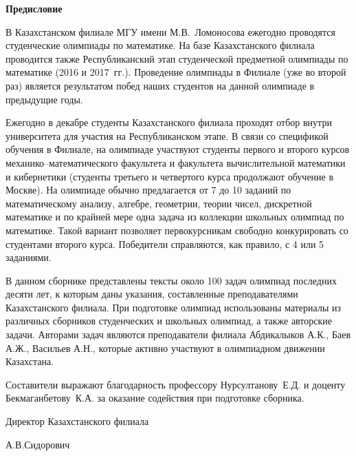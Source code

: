 \documentclass[12pt, a5paper]{article}
\begin{document}
\newpage
\begin{small}
\begin{center}
\textbf{Предисловие}
\end{center}
В Казахстанском филиале  МГУ имени М.В.~Ломоносова ежегодно проводятся студенческие олимпиады по математике. На базе Казахстанского филиала проводится также Республиканский этап студенческой предметной олимпиады по математике (2016 и 2017~гг.). Проведение олимпиады в Филиале (уже во второй раз) является результатом побед наших студентов на данной олимпиаде в предыдущие годы.

Ежегодно в декабре студенты Казахстанского филиала проходят отбор внутри университета для участия на Республиканском этапе. В связи со спецификой обучения в Филиале, на олимпиаде участвуют студенты первого и второго курсов механико--математического факультета и факультета вычислительной математики и кибернетики (студенты третьего и четвертого курса продолжают обучение в Москве). На олимпиаде обычно предлагается от 7 до 10 заданий по математическому анализу, алгебре, геометрии, теории чисел, дискретной математике и по крайней мере одна задача из коллекции школьных олимпиад по математике. Такой вариант позволяет первокурсникам свободно конкурировать со студентами второго курса. Победители справляются, как правило, с 4 или 5 заданиями.

В данном сборнике представлены тексты около 100 задач олимпиад последних десяти лет, к которым даны указания, составленные преподавателями Казахстанского филиала. При подготовке олимпиад использованы материалы из различных сборников студенческих и школьных олимпиад, а также авторские задачи. Авторами задач являются преподаватели филиала Абдикалыков А.К., Баев А.Ж., Васильев А.Н., которые активно участвуют в олимпиадном движении Казахстана. 

Составители выражают благодарность профессору  Нурсултанову~Е.Д. и доценту Бекмаганбетову~К.А. за оказание содействия при подготовке сборника.

\begin{flushright}
Директор Казахстанского филиала

А.В.Сидорович
\end{flushright}
\end{small}

\newpage

\mbox{}

\newpage

\tableofcontents

\newpage
\end{document}
